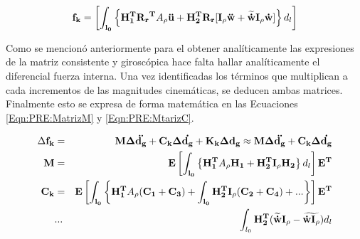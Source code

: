 \begin{equation}\label{Eqn:PRE:FuerzaInercial}
\bf{f}_k=\left [ \int _{l_0} \left \{ \bf{H}_1^T\bf{R_r}^T \text{$A_\rho$}\ddot{\bf{u}} +\bf{H}_2^T \bf{R_r} [\bf{I}_\rho\ddot{\bf{w}}+\widetilde{\dot{\bf{w}}}\bf{I}_\rho\dot{w}] \right \} \text{$d_l$} \right  ]
\end{equation}

Como se mencionó anteriormente para el obtener analíticamente las expresiones de la matriz consistente y giroscópica hace falta hallar analíticamente el diferencial fuerza interna. Una vez identificadas los términos que multiplican a cada incrementos de las magnitudes cinemáticas, se deducen ambas matrices. Finalmente esto se expresa de forma matemática en las Ecuaciones \eqref{Eqn:PRE:MatrizM} y \eqref{Eqn:PRE:MtarizC}.

\begin{eqnarray}
	\Delta \bf{f_k}&= &\bf{M} \Delta \ddot{\bf{d}_g}+\bf{C}_k \Delta \dot{\bf{d}_g}+\bf{K}_k \Delta \bf{d}_g\approx \bf{M} \Delta \ddot{\bf{d}_g}+\bf{C}_k \Delta \dot{\bf{d}_g}\\
	\label{Eqn:PRE:MatrizM}
	\bf{M}&=&\bf{E}\left [ \int _{l_0} \left \{ \bf{H}_1^T \text{$A_\rho$}\bf{H}_1 +\bf{H}_2^T\bf{I}_\rho\bf{H_2} \right \} \text{$d_l$} \right  ]\bf{E}^T\\
	\label{Eqn:PRE:MtarizC}
	\bf{C}_k&=&\bf{E}\left [ \int _{l_0} \left \{ \bf{H}_1^T \text{$A_\rho$}(\bf{C}_1+\bf{C}_3) +\int _{l_0}\bf{H}_2^T\bf{I}_\rho(\bf{C}_2+\bf{C}_4) +...\right \}\right  ]\bf{E}^T\\
	&...& \int_{l_0} \bf{H}_2 ^T(\widetilde{\dot{w}}\bf{I}_\rho-\widetilde{\dot{w}\bf{I}_\rho}) \text{$d_l$}
\end{eqnarray}

\newpage

